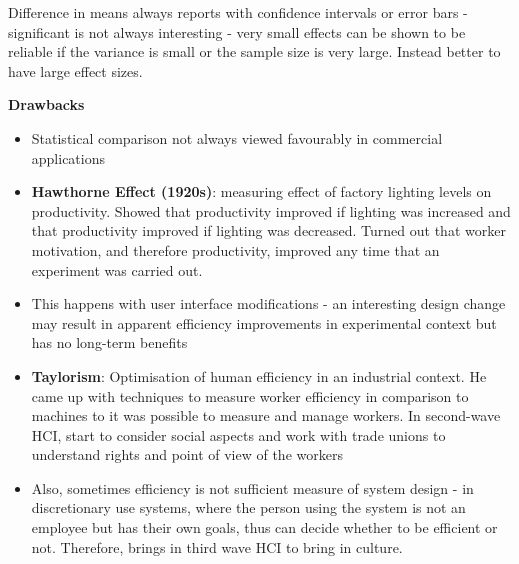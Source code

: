 \documentclass{article}
\newenvironment{cons}{\par\color{red}}{\par}
\begin{document}
Difference in means always reports with confidence intervals or error bars - significant is not always interesting - very small effects can be shown to be reliable if the variance is small or the sample size is very large. Instead better to have large effect sizes.

\begin{cons}
\bigskip
\noindent
\textbf{Drawbacks}
\begin{itemize}
    \item Statistical comparison not always viewed favourably in commercial applications
    \item \textbf{Hawthorne Effect (1920s)}: measuring effect of factory lighting levels on productivity. Showed that productivity improved if lighting was increased and that productivity improved if lighting was decreased. Turned out that worker motivation, and therefore productivity, improved any time that an experiment was carried out.
    \item This happens with user interface modifications - an interesting design change may result in apparent efficiency improvements in experimental context but has no long-term benefits
    \item \textbf{Taylorism}: Optimisation of human efficiency in an industrial context. He came up with techniques to measure worker efficiency in comparison to machines to it was possible to measure and manage workers. In second-wave HCI, start to consider social aspects and work with trade unions to understand rights and point of view of the workers
    \item Also, sometimes efficiency is not sufficient measure of system design - in discretionary use systems, where the person using the system is not an employee but has their own goals, thus can decide whether to be efficient or not. Therefore, brings in third wave HCI to bring in culture. 
\end{itemize}
\end{cons}
\end{document}
